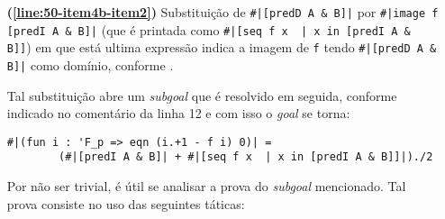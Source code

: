 \begin{enumerate}[label=\textbf{\roman*.}]
\begin{enumerate}[label=\textbf{\roman{enumi}.(\alph*)}]
\begin{enumerate}[label=\textbf{(\alph{enumii}.\arabic*)}]
\begin{enumerate}[listparindent=\parindent]
                                \item[\textbf{(\ref{line:50-item4b-item2})}] Substituição de \lstinline[language=coq]!#|[predD A & B]|! por \lstinline[language=coq]!#|image f [predI A & B]|! (que é printada como \lstinline[language=coq]!#|[seq f x  | x in [predI A & B]]!) em que está ultima expressão indica a imagem de \lstinline[language=coq]!f! tendo \lstinline[language=coq]!#|[predD A & B]|! como domínio, conforme \cite{mathcomp-fintype}. 
                                
                                Tal substituição abre um \textit{subgoal} que é resolvido em seguida, conforme indicado no comentário da linha 12 e com isso o \textit{goal} se torna:
                                        \begin{lstlisting}[language=coq,frame=single,tabsize=1]
#|(fun i : 'F_p => eqn (i.+1 - f i) 0)| = 
        (#|[predI A & B]| + #|[seq f x  | x in [predI A & B]]|)./2
                                        \end{lstlisting}

                                
                                Por não ser trivial, é útil se analisar a prova do \textit{subgoal} mencionado. Tal prova consiste no uso das seguintes táticas:
                                

\end{enumerate}
\end{enumerate}
\end{enumerate}
\end{enumerate}
